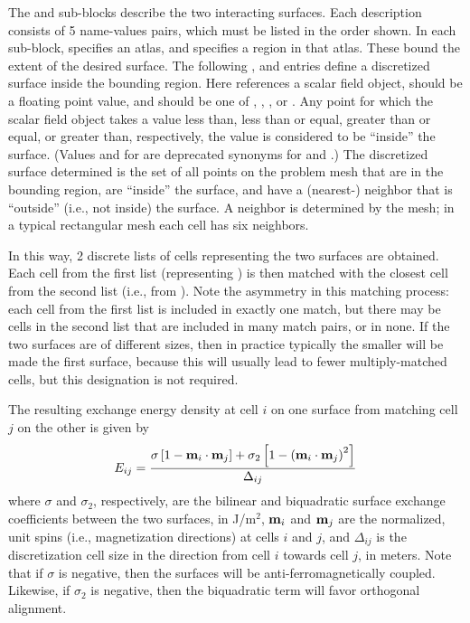 \begin{description}
   The  and  sub-blocks describe
   the two interacting surfaces.  Each description consists of 5
   name-values pairs, which must be listed in the order shown.  In each
   sub-block,  specifies an atlas, and
    specifies a region in that atlas.  These bound
   the extent of the desired surface.  The following
   ,  and
    entries define a discretized surface inside the
   bounding region.  Here  references a scalar
   field object,  should be a floating point value,
   and  should be one of \cd{<}, \cd{<=}, \cd{>=}, or
   \cd{>}.  Any point for which the scalar field object takes a value
   less than, less than or equal, greater than or equal, or greater
   than, respectively, the  value is considered to be
   ``inside'' the surface. (Values \cd{-} and \cd{+} for 
   are deprecated synonyms for \cd{<=} and \cd{>=}.)  The discretized
   surface determined is the set of all points on the problem mesh that
   are in the bounding region, are ``inside'' the surface, and have a
   (nearest-) neighbor that is ``outside'' (i.e., not inside) the
   surface.  A neighbor is determined by the mesh; in a typical
   rectangular mesh each cell has six neighbors.

   In this way, 2 discrete lists of cells representing the two
   surfaces are obtained.  Each cell from the first list (representing
   ) is then matched with the closest cell from the
   second list (i.e., from ).  Note the asymmetry in
   this matching process: each cell from the first list is included in
   exactly one match, but there may be cells in the second list that
   are included in many match pairs, or in none.  If the two surfaces
   are of different sizes, then in practice typically the smaller will
   be made the first surface, because this will usually lead to fewer
   multiply-matched cells, but this designation is not required.

   The resulting exchange energy density at cell $i$ on one surface
   from matching cell $j$ on the other is given by
   \begin{displaymath}
        E_{ij} =  \frac{\sigma\left[1-\textbf{m}_i\cdot\textbf{m}_j\right]
         +\sigma_2\left[1-\left(\textbf{m}_i\cdot\textbf{m}_j\right)^2\right]
        }{\Delta_{ij}}
   \end{displaymath}
   where $\sigma$ and $\sigma_2$, respectively, are the bilinear and
   biquadratic surface exchange coefficients between the two surfaces,
   in J/m${}^2$, $\textbf{m}_i$ and $\textbf{m}_j$ are the normalized, unit spins
   (i.e., magnetization directions) at cells $i$ and $j$, and
   $\Delta_{ij}$ is the discretization cell size in the direction from
   cell $i$ towards cell $j$, in meters.  Note that if $\sigma$ is
   negative, then the surfaces will be anti-ferromagnetically coupled.
   Likewise, if $\sigma_2$ is negative, then the biquadratic term will
   favor orthogonal alignment.


\end{description}
